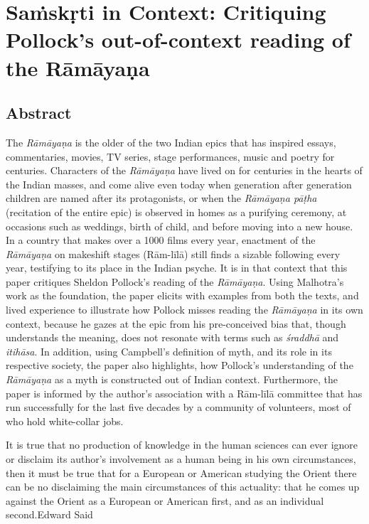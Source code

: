 
\chapter{Saṁskṛti in Context: Critiquing Pollock’s out-of-context reading of the Rāmāyaṇa}



\section*{Abstract}

The \textit{Rāmāyaṇa} is the older of the two Indian epics that has inspired essays, commentaries, movies, TV series, stage performances, music and poetry for centuries. Characters of the \textit{Rāmāyaṇa} have lived on for centuries in the hearts of the Indian masses, and come alive even today when generation after generation children are named after its protagonists, or when the \textit{Rāmāyaṇa pāṭha} (recitation of the entire epic) is observed in homes as a purifying ceremony, at occasions such as weddings, birth of child, and before moving into a new house. In a country that makes over a 1000 films every year, enactment of the \textit{Rāmāyaṇa} on makeshift stages (Rām-līlā) still finds a sizable following every year, testifying to its place in the Indian psyche. It is in that context that this paper critiques Sheldon Pollock’s reading of the \textit{Rāmāyaṇa}. Using Malhotra’s work as the foundation, the paper elicits with examples from both the texts, and lived experience to illustrate how Pollock misses reading the \textit{Rāmāyaṇa} in its own context, because he gazes at the epic from his pre-conceived bias that, though understands the meaning, does not resonate with terms such as \textit{śraddhā} and \textit{itihāsa}. In addition, using Campbell’s definition of myth, and its role in its respective society, the paper also highlights, how Pollock’s understanding of the \textit{Rāmāyaṇa} as a myth is constructed out of Indian context. Furthermore, the paper is informed by the author’s association with a Rām-līlā committee that has run successfully for the last five decades by a community of volunteers, most of who hold white-collar jobs.

\begin{myquote}
It is true that no production of knowledge in the human sciences can ever ignore or disclaim its author’s involvement as a human being in his own circumstances, then it must be true that for a European or American studying the Orient there can be no disclaiming the main circumstances of this actuality: that he comes up against the Orient as a European or American first, and as an individual second.\hfill Edward Said
\end{myquote}

